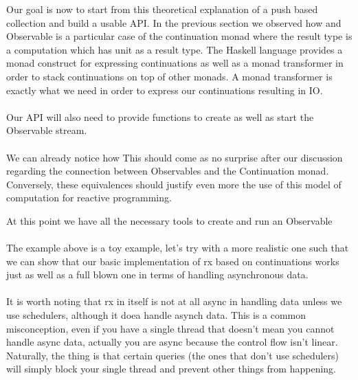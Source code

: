 Our goal is now to start from this theoretical explanation of a push based collection and build a usable API. In the previous section we observed how and Observable is a particular case of the continuation monad where the result type is a computation which has unit as a result type. The Haskell language provides a monad construct for expressing continuations as well as a monad transformer in order to stack continuations on top of other monads. A monad transformer is exactly what we need in order to express our continuations resulting in IO.\\

\\

Our API will also need to provide functions to create as well as start the Observable stream.\\

\\

We can already notice how This should come as no surprise after our discussion regarding the connection between Observables and the Continuation monad. Conversely, these equivalences should justify even more the use of this model of computation for reactive programming.

At this point we have all the necessary tools to create and run an Observable\\

\\

The example above is a toy example, let's try with a more realistic one such that we can show that our basic implementation of rx based on continuations works just as well as a full blown one in terms of handling asynchronous data.\\ 

\\

It is worth noting that rx in itself is not at all async in handling data unless we use schedulers, although it doea handle asynch data. This is a common misconception, even if you have a single thread that doesn't mean you cannot handle async data, actually you are async because the control flow isn't linear. Naturally, the thing is that certain queries (the ones that don't use schedulers) will simply block your single thread and prevent other things from happening.

